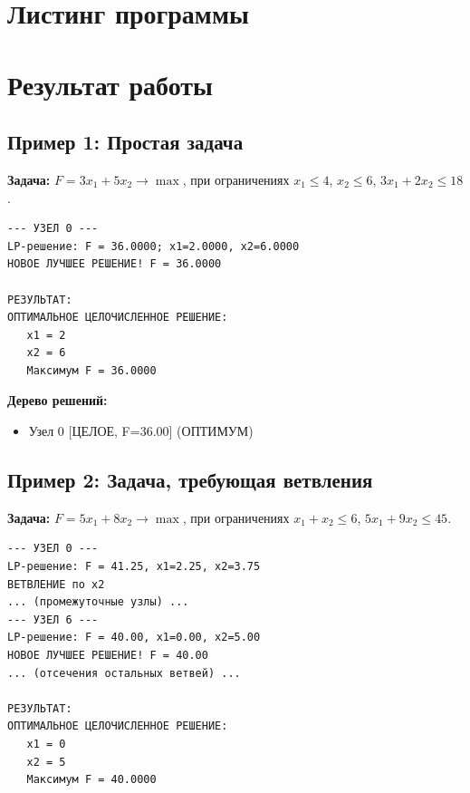 \documentclass[oneside,a4paper,14pt]{extarticle}
\begin{document}
\section{Листинг программы}





\section{Результат работы}
\subsection{Пример 1: Простая задача}
\textbf{Задача:} $F = 3x_1 + 5x_2 \to \max$, при ограничениях $x_1 \le 4$, $x_2 \le 6$, $3x_1 + 2x_2 \le 18$.
\begin{verbatim}
--- УЗЕЛ 0 ---
LP-решение: F = 36.0000; x1=2.0000, x2=6.0000
НОВОЕ ЛУЧШЕЕ РЕШЕНИЕ! F = 36.0000

РЕЗУЛЬТАТ:
ОПТИМАЛЬНОЕ ЦЕЛОЧИСЛЕННОЕ РЕШЕНИЕ:
   x1 = 2
   x2 = 6
   Максимум F = 36.0000
\end{verbatim}

\textbf{Дерево решений:}
\begin{itemize}
    \item Узел 0 [ЦЕЛОЕ, F=36.00] (ОПТИМУМ)
\end{itemize}

\subsection{Пример 2: Задача, требующая ветвления}
\textbf{Задача:} $F = 5x_1 + 8x_2 \to \max$, при ограничениях $x_1 + x_2 \le 6$, $5x_1 + 9x_2 \le 45$.
\begin{verbatim}
--- УЗЕЛ 0 ---
LP-решение: F = 41.25, x1=2.25, x2=3.75
ВЕТВЛЕНИЕ по x2
... (промежуточные узлы) ...
--- УЗЕЛ 6 ---
LP-решение: F = 40.00, x1=0.00, x2=5.00
НОВОЕ ЛУЧШЕЕ РЕШЕНИЕ! F = 40.00
... (отсечения остальных ветвей) ...

РЕЗУЛЬТАТ:
ОПТИМАЛЬНОЕ ЦЕЛОЧИСЛЕННОЕ РЕШЕНИЕ:
   x1 = 0
   x2 = 5
   Максимум F = 40.0000
\end{verbatim}
\end{document}
